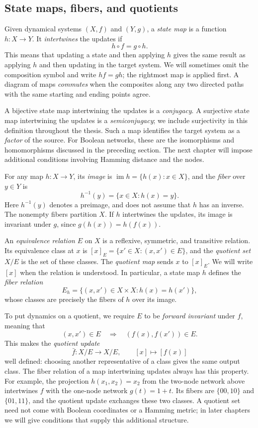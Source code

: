 \subsection{State maps, fibers, and quotients}

Given dynamical systems $(X,f)$ and $(Y,g)$, a \emph{state map} is a function $h\colon X\to Y$. It \emph{intertwines} the updates if
\[
    h\circ f=g\circ h.
\]
This means that updating a state and then applying $h$ gives the same result as applying $h$ and then updating in the target system. We will sometimes omit the composition symbol and write $hf=gh$; the rightmost map is applied first. A diagram of maps \emph{commutes} when the composites along any two directed paths with the same starting and ending points agree.

A bijective state map intertwining the updates is a \emph{conjugacy}. A surjective state map intertwining the updates is a \emph{semiconjugacy}; we include surjectivity in this definition throughout the thesis. Such a map identifies the target system as a \emph{factor} of the source. For Boolean networks, these are the isomorphisms and homomorphisms discussed in the preceding section. The next chapter will impose additional conditions involving Hamming distance and the nodes.

For any map $h\colon X\to Y$, its \emph{image} is $\operatorname{im}h=\{h(x):x\in X\}$, and the \emph{fiber} over $y\in Y$ is
\[
    h^{-1}(y)=\{x\in X:h(x)=y\}.
\]
Here $h^{-1}(y)$ denotes a preimage, and does not assume that $h$ has an inverse. The nonempty fibers partition $X$. If $h$ intertwines the updates, its image is invariant under $g$, since $g(h(x))=h(f(x))$.

An \emph{equivalence relation} $E$ on $X$ is a reflexive, symmetric, and transitive relation. Its equivalence class at $x$ is $[x]_E=\{x'\in X:(x,x')\in E\}$, and the \emph{quotient set} $X/E$ is the set of these classes. The \emph{quotient map} sends $x$ to $[x]_E$. We will write $[x]$ when the relation is understood. In particular, a state map $h$ defines the \emph{fiber relation}
\[
    E_h=\{(x,x')\in X\times X:h(x)=h(x')\},
\]
whose classes are precisely the fibers of $h$ over its image.

To put dynamics on a quotient, we require $E$ to be \emph{forward invariant} under $f$, meaning that
\[
    (x,x')\in E\quad\Longrightarrow\quad(f(x),f(x'))\in E.
\]
This makes the \emph{quotient update}
\[
    \bar f\colon X/E\to X/E,\qquad [x]\longmapsto[f(x)]
\]
well defined: choosing another representative of a class gives the same output class. The fiber relation of a map intertwining updates always has this property. For example, the projection $h(x_1,x_2)=x_2$ from the two-node network above intertwines $f$ with the one-node network $g(t)=1+t$. Its fibers are $\{00,10\}$ and $\{01,11\}$, and the quotient update exchanges these two classes. A quotient set need not come with Boolean coordinates or a Hamming metric; in later chapters we will give conditions that supply this additional structure.

